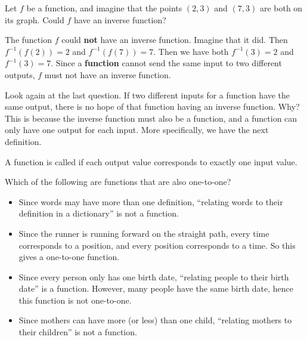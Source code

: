 \documentclass{ximera}
\begin{document}
\begin{question}
  Let $f$ be a function, and imagine that the points $(2,3)$ and
  $(7,3)$ are both on its graph.  Could $f$ have an inverse function?
  \begin{prompt}
  \begin{multipleChoice}
  \end{multipleChoice}
  \begin{feedback}
    The function $f$ could \textbf{not} have an inverse function.
    Imagine that it did.  Then $f^{-1}(f(2)) = 2$ and $f^{-1}(f(7)) =
    7$.  Then we have both $f^{-1}(3) = 2$ and $f^{-1}(3) = 7$.  Since
    a \textbf{function} cannot send the same input to two different
    outputs, $f$ must not have an inverse function.
  \end{feedback}
  \end{prompt}
\end{question}


Look again at the last question.  If two different inputs for a
function have the same output, there is no hope of that function
having an inverse function.  Why?  This is because the inverse
function must also be a function, and a function can only have one
output for each input.  More specifically, we have the next
definition.

\begin{definition}
A function is called  if each output value corresponds
to exactly one input value.
\end{definition}

\begin{question}
  Which of the following are functions that are also one-to-one?
  \begin{selectAll}
      
  \end{selectAll}
  \begin{feedback}\hfil
    \begin{itemize}
    \item Since words may have more than one definition, ``relating
      words to their definition in a dictionary'' is not a function.
    \item Since the runner is running forward on the straight path,
      every time corresponds to a position, and every position
      corresponds to a time. So this gives a one-to-one function.
    \item Since every person only has one birth date, ``relating
      people to their birth date'' is a function. However, many people
      have the same birth date, hence this function is not one-to-one.
      \item Since mothers can have more (or less) than one child,
        ``relating mothers to their children'' is not a function.
    \end{itemize}
  \end{feedback}
\end{question}
\end{document}
